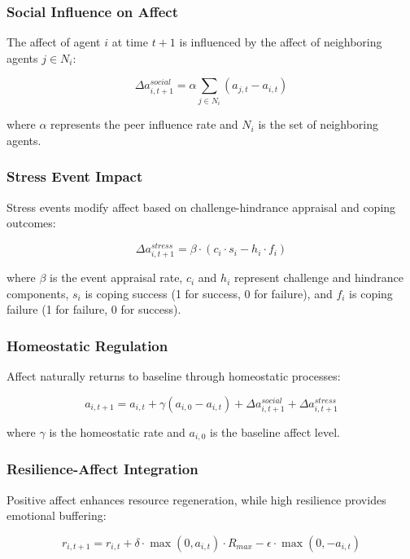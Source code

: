 \documentclass[
  letterpaper,
  DIV=11,
  numbers=noendperiod]{scrartcl}
\begin{document}
\subsubsection{Social Influence on
Affect}\label{social-influence-on-affect}

The affect of agent \(i\) at time \(t+1\) is influenced by the affect of
neighboring agents \(j \in N_i\):

\[\Delta a_{i,t+1}^{social} = \alpha \sum_{j \in N_i} (a_{j,t} - a_{i,t})\]

where \(\alpha\) represents the peer influence rate and \(N_i\) is the
set of neighboring agents.

\subsubsection{Stress Event Impact}\label{stress-event-impact}

Stress events modify affect based on challenge-hindrance appraisal and
coping outcomes:

\[\Delta a_{i,t+1}^{stress} = \beta \cdot (c_i \cdot s_i - h_i \cdot f_i)\]

where \(\beta\) is the event appraisal rate, \(c_i\) and \(h_i\)
represent challenge and hindrance components, \(s_i\) is coping success
(1 for success, 0 for failure), and \(f_i\) is coping failure (1 for
failure, 0 for success).

\subsubsection{Homeostatic Regulation}\label{homeostatic-regulation}

Affect naturally returns to baseline through homeostatic processes:

\[a_{i,t+1} = a_{i,t} + \gamma (a_{i,0} - a_{i,t}) + \Delta a_{i,t+1}^{social} + \Delta a_{i,t+1}^{stress}\]

where \(\gamma\) is the homeostatic rate and \(a_{i,0}\) is the baseline
affect level.

\subsubsection{Resilience-Affect
Integration}\label{resilience-affect-integration}

Positive affect enhances resource regeneration, while high resilience
provides emotional buffering:

\[r_{i,t+1} = r_{i,t} + \delta \cdot \max(0, a_{i,t}) \cdot R_{max} - \epsilon \cdot \max(0, -a_{i,t})\]
\end{document}

